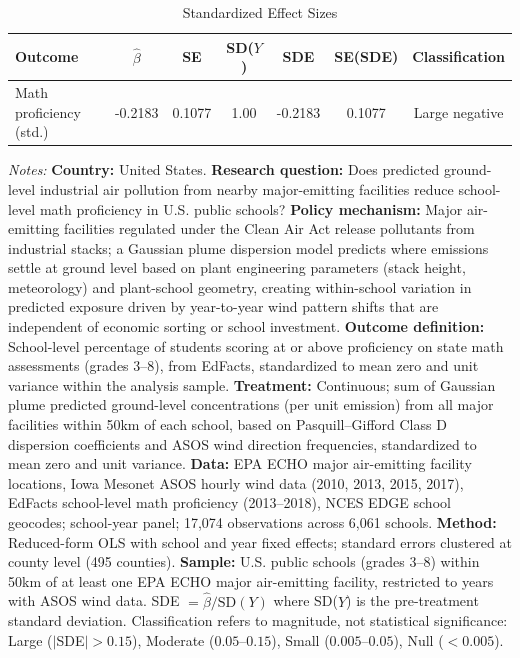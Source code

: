 \begin{table}[htbp]
\centering
\caption{Standardized Effect Sizes}
\label{tab:sde}
\begin{tabular}{lcccccc}
\hline\hline
Outcome & $\hat{\beta}$ & SE & SD($Y$) & SDE & SE(SDE) & Classification \\
\hline
Math proficiency (std.) & -0.2183 & 0.1077 & 1.00 & -0.2183 & 0.1077 & Large negative \\
\hline\hline
\end{tabular}
\begin{tablenotes}
\small
\item \textit{Notes:} \textbf{Country:} United States. \textbf{Research question:} Does predicted ground-level industrial air pollution from nearby major-emitting facilities reduce school-level math proficiency in U.S. public schools? \textbf{Policy mechanism:} Major air-emitting facilities regulated under the Clean Air Act release pollutants from industrial stacks; a Gaussian plume dispersion model predicts where emissions settle at ground level based on plant engineering parameters (stack height, meteorology) and plant-school geometry, creating within-school variation in predicted exposure driven by year-to-year wind pattern shifts that are independent of economic sorting or school investment. \textbf{Outcome definition:} School-level percentage of students scoring at or above proficiency on state math assessments (grades 3--8), from EdFacts, standardized to mean zero and unit variance within the analysis sample. \textbf{Treatment:} Continuous; sum of Gaussian plume predicted ground-level concentrations (per unit emission) from all major facilities within 50km of each school, based on Pasquill--Gifford Class D dispersion coefficients and ASOS wind direction frequencies, standardized to mean zero and unit variance. \textbf{Data:} EPA ECHO major air-emitting facility locations, Iowa Mesonet ASOS hourly wind data (2010, 2013, 2015, 2017), EdFacts school-level math proficiency (2013--2018), NCES EDGE school geocodes; school-year panel; 17,074 observations across 6,061 schools. \textbf{Method:} Reduced-form OLS with school and year fixed effects; standard errors clustered at county level (495 counties). \textbf{Sample:} U.S. public schools (grades 3--8) within 50km of at least one EPA ECHO major air-emitting facility, restricted to years with ASOS wind data. SDE $= \hat{\beta} / \text{SD}(Y)$ where SD($Y$) is the pre-treatment standard deviation. Classification refers to magnitude, not statistical significance: Large ($|$SDE$| > 0.15$), Moderate ($0.05$--$0.15$), Small ($0.005$--$0.05$), Null ($< 0.005$).
\end{tablenotes}
\end{table}

